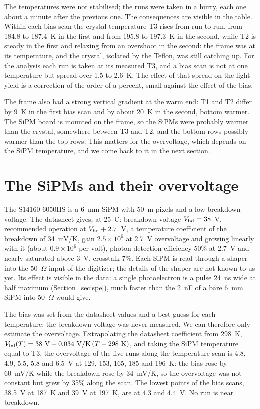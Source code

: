 \documentclass[11pt]{article}
\begin{document}
The temperatures were not stabilised; the runs were taken in a hurry,
each one about a minute after the previous one. The consequences are
visible in the table. Within each bias scan the crystal temperature T3
rises from run to run, from 184.8 to 187.4~K in the first and from 195.8 to
197.3~K in the second, while T2 is steady in the first and relaxing from an
overshoot in the second: the frame was at its temperature, and the crystal,
isolated by the Teflon, was still catching up. For the analysis each run
is taken at its measured T3, and a bias scan is not at one temperature but
spread over 1.5 to 2.6~K. The effect of that spread on the light yield is
a correction of the order of a percent, small against the effect of the
bias.

The frame also had a strong vertical gradient at the warm end: T1 and T2
differ by 9~K in the first bias scan and by about 20~K in the second,
bottom warmer. The SiPM board is mounted on the frame, so the SiPMs were
probably warmer than the crystal, somewhere between T3 and T2, and the
bottom rows possibly warmer than the top rows. This matters for the
overvoltage, which depends on the SiPM temperature, and we come back to it
in the next section.

\section{The SiPMs and their overvoltage}
\label{sec:sipm}

The S14160-6050HS is a 6~mm SiPM with 50~\textmu m pixels and a low breakdown
voltage. The datasheet gives, at 25~\textdegree C: breakdown voltage
$V_{\rm bd} = 38$~V, recommended operation at $V_{\rm bd} + 2.7$~V, a
temperature coefficient of the breakdown of 34~mV/K, gain $2.5 \times 10^6$
at 2.7~V overvoltage and growing linearly with it (about $0.9 \times 10^6$
per volt), photon detection efficiency 50\% at 2.7~V and nearly saturated
above 3~V, crosstalk 7\%. Each SiPM is read through a shaper into the
50~$\Omega$ input of the digitizer; the details of the shaper are not
known to us yet. Its effect is visible in the data: a single
photoelectron is a pulse 24~ns wide at half maximum (Section~\ref{sec:spe}),
much faster than the 2~nF of a bare 6~mm SiPM into 50~$\Omega$ would give.

The bias was set from the datasheet values and a best guess for each
temperature; the breakdown voltage was never measured. We can therefore
only estimate the overvoltage. Extrapolating the datasheet coefficient from
298~K, $V_{\rm bd}(T) = 38~\mathrm{V} + 0.034~\mathrm{V/K}\,(T - 298~\mathrm{K})$,
and taking the SiPM temperature equal to T3, the overvoltage of the five
runs along the temperature scan is 4.8, 4.9, 5.5, 5.8 and 6.5~V at 129,
153, 165, 185 and 196~K: the bias rose by 60~mV/K while the breakdown rose
by 34~mV/K, so the overvoltage was not constant but grew by 35\% along the
scan. The lowest points of the bias scans, 38.5~V at 187~K and 39~V at
197~K, are at 4.3 and 4.4~V. No run is near breakdown.
\end{document}
